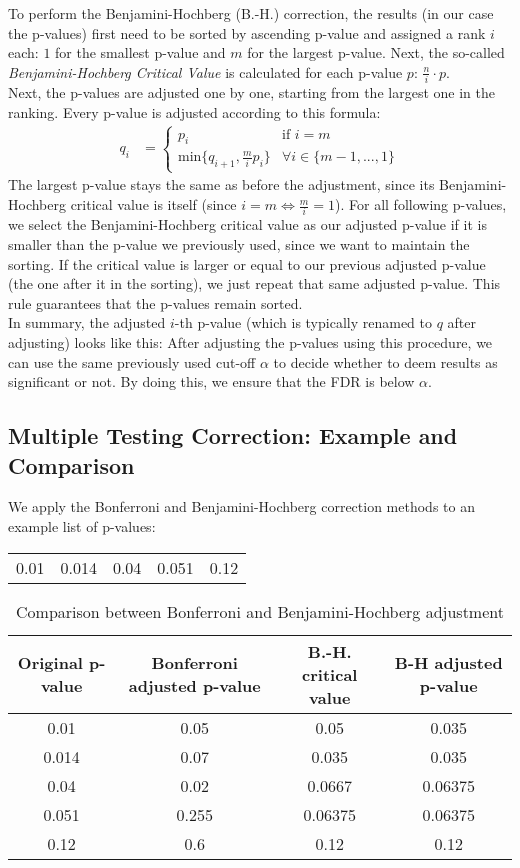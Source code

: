 To perform the Benjamini-Hochberg (B.-H.) correction, the results (in our case the p-values) first need to be sorted by ascending p-value and assigned a rank $i$ each: $1$ for the smallest p-value and $m$ for the largest p-value.
Next, the so-called \emph{Benjamini-Hochberg Critical Value} is calculated for each p-value $p$: $\frac{n}{i}\cdot p$.\\
Next, the p-values are adjusted one by one, starting from the largest one in the ranking. Every p-value is adjusted according to this formula:
\begin{align}
	q_i&=\begin{cases}
		p_i& \text{if }i=m\\
		\text{min}\{q_{i+1}, \frac{m}{i}p_i\}&\forall i \in \{m-1, ..., 1\}
	\end{cases}
\end{align}
The largest p-value stays the same as before the adjustment, since its Benjamini-Hochberg critical value is itself (since $i=m \Leftrightarrow \frac{m}{i} = 1$). For all following p-values, we select the Benjamini-Hochberg critical value as our adjusted p-value if it is smaller than the p-value we previously used, since we want to maintain the sorting. If the critical value is larger or equal to our previous adjusted p-value (the one after it in the sorting), we just repeat that same adjusted p-value. This rule guarantees that the p-values remain sorted.\\
In summary, the adjusted $i$-th p-value (which is typically renamed to $q$ after adjusting) looks like this:
After adjusting the p-values using this procedure, we can use the same previously used cut-off $\alpha$ to decide whether to deem results as significant or not. By doing this, we ensure that the FDR is below $\alpha$.


\subsection{Multiple Testing Correction: Example and Comparison}\label{subsec:multi_example}
We apply the Bonferroni and Benjamini-Hochberg correction methods to an example list of p-values:\\
\begin{tabular}{ccccc}
	0.01&0.014&0.04&0.051&0.12
\end{tabular}

\begin{table}
	\begin{tabular}{|c|c|c|c|}
		\hline
		Original p-value&Bonferroni adjusted p-value&B.-H. critical value&B-H adjusted p-value\\
		\hline
		0.01&0.05&0.05&0.035\\
		0.014&0.07&0.035&0.035\\
		0.04&0.02&0.0667&0.06375\\
		0.051&0.255&0.06375&0.06375\\
		0.12&0.6&0.12&0.12\\
		\hline
	\end{tabular}
	\caption{Comparison between Bonferroni and Benjamini-Hochberg adjustment}
	\label{tab:adjustments}
\end{table}

